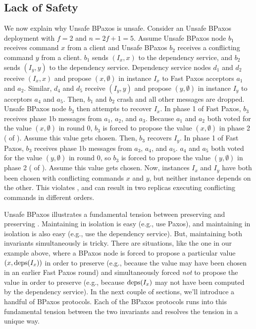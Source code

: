 \subsection{Lack of Safety}
We now explain why Unsafe BPaxos is unsafe. Consider an Unsafe BPaxos
deployment with $f = 2$ and $n = 2f + 1 = 5$.
%
Assume Unsafe BPaxos node $b_1$ receives command $x$ from a client and
Unsafe BPaxos $b_2$ receives a conflicting command $y$ from a client. $b_1$
sends $(I_x, x)$ to the dependency service, and $b_2$ sends $(I_y, y)$ to the
dependency service. Dependency service nodes $d_1$ and $d_2$ receive $(I_x, x)$
and propose $(x, \emptyset)$ in instance $I_x$ to Fast Paxos acceptors $a_1$
and $a_2$. Similar, $d_4$ and $d_5$ receive $(I_y, y)$ and propose $(y,
\emptyset)$ in instance $I_y$ to acceptors $a_4$ and $a_5$. Then, $b_1$ and
$b_2$ crash and all other messages are dropped. Unsafe BPaxos node $b_3$
then attempts to recover $I_x$. In phase 1 of Fast Paxos, $b_3$ receives phase
1b messages from $a_1$, $a_2$, and $a_3$. Because $a_1$ and $a_2$ both voted
for the value $(x, \emptyset{})$ in round $0$, $b_3$ is forced to propose the
value $(x, \emptyset)$ in phase 2 ( of
). Assume this value gets chosen. Then, $b_3$ recovers
$I_y$. In phase 1 of Fast Paxos, $b_3$ receives phase 1b messages from $a_3$,
$a_4$, and $a_5$. $a_4$ and $a_5$ both voted for the value $(y, \emptyset{})$
in round $0$, so $b_3$ is forced to propose the value $(y, \emptyset)$ in phase
2 ( of ). Assume this value gets
chosen. Now, instances $I_x$ and $I_y$ have both been chosen with conflicting
commands $x$ and $y$, but neither instance depends on the other. This violates
, and can result in two replicas executing
conflicting commands in different orders.

Unsafe BPaxos illustrates a fundamental tension between preserving
 and preserving .
Maintaining  in isolation is easy (e.g., use Paxos),
and maintaining  in isolation is also easy (e.g., use
the dependency service). But, maintaining both invariants simultaneously is
tricky. There are situations, like the one in our example above, where a BPaxos
node is forced to propose a particular value $(x, \text{deps}(I_x))$ in order to
preserve  (e.g., because the value may have been
chosen in an earlier Fast Paxos round) and simultaneously forced \emph{not} to
propose the value in order to preserve  (e.g.,
because $\text{deps}(I_x)$ may not have been computed by the dependency service).
%
In the next couple of sections, we'll introduce a handful of BPaxos protocols.
Each of the BPaxos protocols runs into this fundamental tension between the two
invariants and resolves the tension in a unique way.
